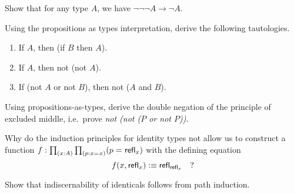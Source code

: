 \begin{ex}\label{ex:neg-ldn}
  Show that for any type $A$, we have $\neg\neg\neg A \to \neg A$.
\end{ex}

\begin{ex}\label{ex:tautologies}
  Using the propositions as types interpretation, derive the following tautologies.
  \begin{enumerate}
  \item If $A$, then (if $B$ then $A$).
  \item If $A$, then not (not $A$).
  \item If (not $A$ or not $B$), then not ($A$ and $B$).
  \end{enumerate}
\end{ex}

\begin{ex}\label{ex:not-not-lem}
  Using propositions-as-types, derive the double negation of the principle of excluded middle, i.e.\ prove \emph{not (not ($P$ or not $P$))}.
\end{ex}

\begin{ex}\label{ex:without-K}
  Why do the induction principles for identity types not allow us to construct a function $f: \prd{x:A}{p:\id{x}{x}} (\id{p}{\refl{x}})$ with the defining equation
  \[ f(x,\mathsf{refl}_{x}) \vcentcolon\equiv \mathsf{refl}_{\mathsf{refl}_{x}} \quad ?\]
\end{ex}

\begin{ex}\label{ex:subtFromPathInd}
  Show that indiscernability of identicals follows from path induction.  
\end{ex}


